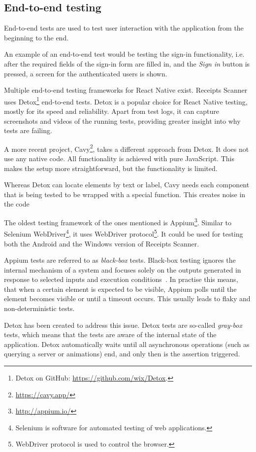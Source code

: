 \documentclass[
  digital, %
  table,   %
  oneside, %
  lof,     %
  lot,     %
]{fithesis3}
\begin{document}
\subsection{End-to-end testing}
\label{sec:end_to_end_testing}
End-to-end tests are used to test user interaction with the application from the beginning to the end. 

An example of an end-to-end test would be testing the sign-in functionality, i.e. after the required fields of the sign-in form are filled in, and the \textit{Sign in} button is pressed, a screen for the authenticated users is shown.

Multiple end-to-end testing frameworks for React Native exist. Receipts Scanner uses Detox\footnote{Detox on GitHub: \url{https://github.com/wix/Detox}.} end-to-end tests. Detox is a popular choice for React Native testing, mostly for its speed and reliability. Apart from test logs, it can capture screenshots and videos of the running tests, providing greater insight into why tests are failing.

A more recent project, Cavy\footnote{\url{https://cavy.app/}}, takes a different approach from Detox. It does not use any native code. All functionality is achieved with pure JavaScript. This makes the setup more straightforward, but the functionality is limited.

Whereas Detox can locate elements by text or label, Cavy needs each component that is being tested to be wrapped with a special function. This creates noise in the code

The oldest testing framework of the ones mentioned is Appium\footnote{\url{http://appium.io/}}. Similar to Selenium WebDriver\footnote{Selenium is software for automated testing of web applications.}, it uses WebDriver protocol\footnote{WebDriver protocol is used to control the browser.}. It could be used for testing both the Android and the Windows version of Receipts Scanner.

Appium tests are referred to as \textit{black-box} tests. Black-box testing ignores the internal mechanism of a system and focuses solely on the outputs generated in response to selected inputs and execution conditions~\cite{Gao2003Testing}. In practise this means, that when a certain element is expected to be visible, Appium polls until the element becomes visible or until a timeout occurs. This usually leads to flaky and non-deterministic tests.

Detox has been created to address this issue. Detox tests are so-called \textit{gray-box} tests, which means that the tests are aware of the internal state of the application. Detox automatically waits until all asynchronous operations (such as querying a server or animations) end, and only then is the assertion triggered.
\end{document}
